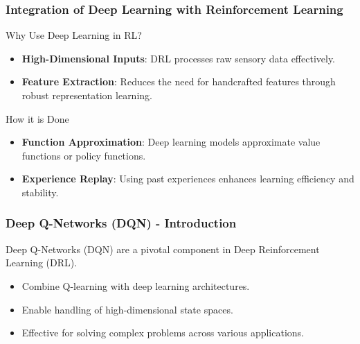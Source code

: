 \documentclass[aspectratio=169]{beamer}
\begin{document}
\begin{frame}[fragile]
    \frametitle{Integration of Deep Learning with Reinforcement Learning}
    \begin{block}{Why Use Deep Learning in RL?}
        \begin{itemize}
            \item \textbf{High-Dimensional Inputs}: DRL processes raw sensory data effectively.
            \item \textbf{Feature Extraction}: Reduces the need for handcrafted features through robust representation learning.
        \end{itemize}
    \end{block}
    
    \begin{block}{How it is Done}
        \begin{itemize}
            \item \textbf{Function Approximation}: Deep learning models approximate value functions or policy functions.
            \item \textbf{Experience Replay}: Using past experiences enhances learning efficiency and stability.
        \end{itemize}
    \end{block}
\end{frame}

\begin{frame}[fragile]
    \frametitle{Deep Q-Networks (DQN) - Introduction}
    Deep Q-Networks (DQN) are a pivotal component in Deep Reinforcement Learning (DRL).
    
    \begin{itemize}
        \item Combine Q-learning with deep learning architectures.
        \item Enable handling of high-dimensional state spaces.
        \item Effective for solving complex problems across various applications.
    \end{itemize}
\end{frame}
\end{document}
